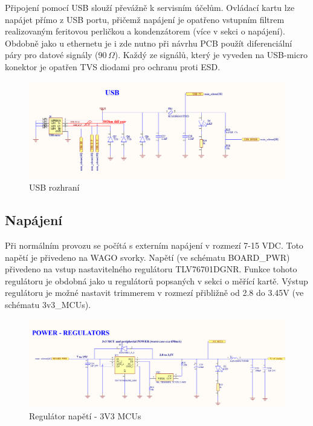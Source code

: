     Připojení pomocí USB slouží převážně k servisním účelům.
    Ovládací kartu lze napájet přímo z USB portu, přičemž napájení je opatřeno
    vstupním filtrem realizovaným feritovou perličkou a kondenzátorem (více v sekci o napájení).
    Obdobně jako u ethernetu je i zde nutno při návrhu PCB použít diferenciální páry
    pro datové signály (90\,$\Omega$). Každý ze signálů,
    který je vyveden na USB-micro konektor je opatřen TVS diodami pro ochranu
    proti ESD. \\

    \begin{figure}[ht!]
        \centering
        \includegraphics[width = 1\textwidth]{obrazky/USB.png}
        \caption{USB rozhraní}
        \label{fig: USB rozhraní}
    \end{figure}

\clearpage
    \subsection{Napájení}
    Při normálním provozu se počítá s externím napájení v rozmezí 7-15 VDC.
    Toto napětí je přivedeno na WAGO svorky. Napětí (ve schématu BOARD\_PWR)
    přivedeno na vstup nastavitelného regulátoru TLV76701DGNR. Funkce tohoto regulátoru je obdobná
    jako u regulátorů popsaných v sekci o měřící kartě. Výstup regulátoru je možné
    nastavit trimmerem v rozmezí přibližně od 2.8 do 3.45V (ve schématu 3v3\_MCUs).\\

    \begin{figure}[ht!]
        \centering
        \includegraphics[width = 1\textwidth]{obrazky/PWR_REG_3V3.png}
        \caption{Regulátor napětí - 3V3 MCUs}
        \label{fig:Regulátor napětí - 3V3 MCUs}
    \end{figure}

